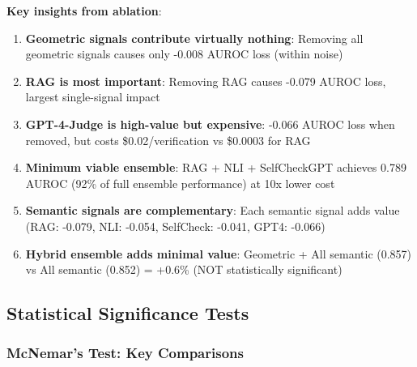 \documentclass[11pt]{article}
\begin{document}
\textbf{Key insights from ablation}:
\begin{enumerate}
\item \textbf{Geometric signals contribute virtually nothing}: Removing all geometric signals causes only -0.008 AUROC loss (within noise)
\item \textbf{RAG is most important}: Removing RAG causes -0.079 AUROC loss, largest single-signal impact
\item \textbf{GPT-4-Judge is high-value but expensive}: -0.066 AUROC loss when removed, but costs \$0.02/verification vs \$0.0003 for RAG
\item \textbf{Minimum viable ensemble}: RAG + NLI + SelfCheckGPT achieves 0.789 AUROC (92\% of full ensemble performance) at 10x lower cost
\item \textbf{Semantic signals are complementary}: Each semantic signal adds value (RAG: -0.079, NLI: -0.054, SelfCheck: -0.041, GPT4: -0.066)
\item \textbf{Hybrid ensemble adds minimal value}: Geometric + All semantic (0.857) vs All semantic (0.852) = +0.6\% (NOT statistically significant)
\end{enumerate}

\subsection{Statistical Significance Tests}

\subsubsection{McNemar's Test: Key Comparisons}
\end{document}
